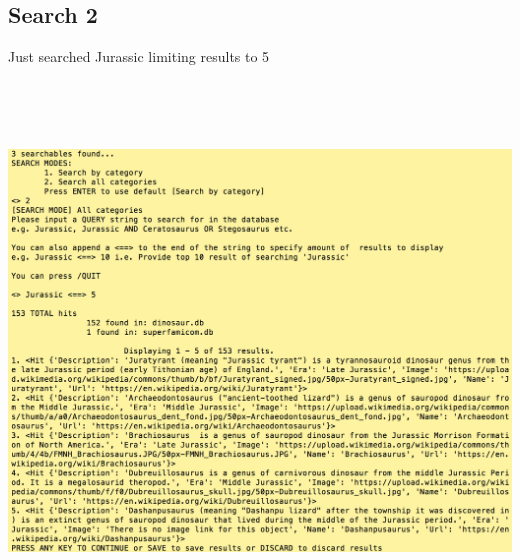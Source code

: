 \documentclass[]{article}
\begin{document}
\subsection{Search 2}
Just searched Jurassic limiting results to 5\\
\includegraphics[width=15cm, height=15cm]{search2.png}
\end{document}
